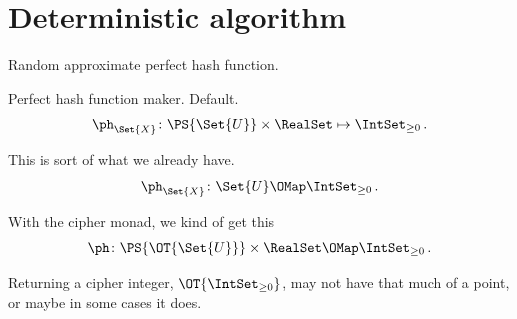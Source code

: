 \documentclass[ ../main.tex]{subfiles}
\begin{document}
\section{Deterministic algorithm}


Random approximate perfect hash function.


Perfect hash function maker.
Default.
\begin{equation}
\ph_{\Set{X}} \colon \PS{\Set{U}} \times \RealSet \mapsto \IntSet_{\geq 0}\,.
\end{equation}


This is sort of what we already have.
\begin{equation}
\ph_{\Set{X}} \colon \Set{U} \OMap \IntSet_{\geq 0}\,.
\end{equation}


With the cipher monad, we kind of get this
\begin{equation}
\ph \colon \PS{\OT{\Set{U}}} \times \RealSet \OMap \IntSet_{\geq 0}\,.
\end{equation}

Returning a cipher integer, $\OT{\IntSet_{\geq 0}}$, may not have that much of a point, or maybe in some cases it does.
	
\end{document}
